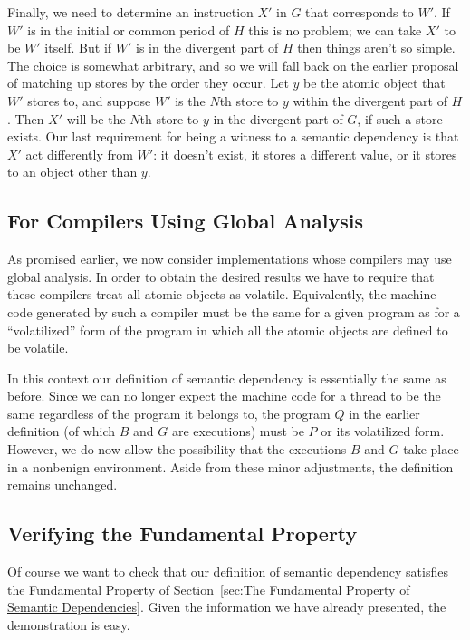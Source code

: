 \documentclass[10]{article}
\begin{document}
Finally, we need to determine an instruction $X'$ in $G$ that
corresponds to $W'$.
If $W'$ is in the initial or common period of $H$ this is no
problem; we can take $X'$ to be $W'$ itself.
But if $W'$ is in the divergent part of $H$ then things aren't so
simple.
The choice is somewhat arbitrary, and so we will fall back on the
earlier proposal of matching up stores by the order they occur.
Let $y$ be the atomic object that $W'$ stores to, and suppose $W'$
is the $N$th store to $y$ within the divergent part of $H$.
Then $X'$ will be the $N$th store to $y$ in the divergent part
of $G$, if such a store exists.
Our last requirement for being a witness to a semantic dependency
is that $X'$ act differently from $W'$: it doesn't exist, it stores
a different value, or it stores to an object other than $y$.

\subsection{For Compilers Using Global Analysis}
\label{sec:For Compilers Using Global Analysis}

As promised earlier, we now consider implementations whose compilers
may use global analysis.
In order to obtain the desired results we have to require that these
compilers treat all atomic objects as volatile.
Equivalently, the machine code generated by such a compiler must be
the same for a given program as for a ``volatilized'' form of the
program in which all the atomic objects are defined to be volatile.

In this context our definition of semantic dependency is essentially
the same as before.
Since we can no longer expect the machine code for a thread to be the
same regardless of the program it belongs to, the program $Q$ in the
earlier definition (of which $B$ and $G$ are executions) must be
$P$ or its volatilized form.
However, we do now allow the possibility that the executions $B$ and
$G$ take place in a nonbenign environment.
Aside from these minor adjustments, the definition remains unchanged.

\subsection{Verifying the Fundamental Property}
\label{sec:Verifying the Fundamental Property}

Of course we want to check that our definition of semantic dependency
satisfies the Fundamental Property of
Section~\ref{sec:The Fundamental Property of Semantic Dependencies}.
Given the information we have already presented, the demonstration is
easy.
\end{document}
